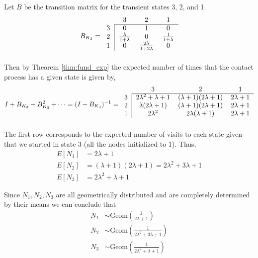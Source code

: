 
Let $B$ be the transition matrix for the transient states 3, 2, and 1.
$$
B_{K_3} = \begin{blockarray}{cccc}
    & 3 & 2 & 1\\
    \begin{block}{c|ccc}
    \cline{2-4}
        3 & 0 & 1 & 0\\
        2 & \frac{\lambda}{1 + \lambda} & 0 &
        \frac{1}{1 + \lambda}\\
        1 & 0 & \frac{2\lambda}{1 + 2 \lambda} & 0\\
    \end{block}
    \end{blockarray}
$$
Then by Theorem \ref{thm:fund_exp} the expected number of times that the contact process has a given state is given by,
$$
    I + B_{K_3} + B_{K_3}^2 + \cdots = (I - B_{K_3})^{-1} = \begin{blockarray}{cccc}
    & 3 & 2 & 1\\
    \begin{block}{c|ccc}
    \cline{2-4}
    3 & 2 \lambda^2 + \lambda + 1 & (\lambda + 1) (2 \lambda + 1) &  2 \lambda + 1\\
    2 & \lambda (2 \lambda + 1) & (\lambda + 1)(2 \lambda + 1) & 2 \lambda + 1\\
    1 & 2 \lambda^2 & 2 \lambda ( \lambda + 1) &  2\lambda + 1\\
    \end{block}
    \end{blockarray}
$$
The first row corresponds to the expected number of visits to each state given that we started in state 3 (all the nodes initialized to 1).
Thus,
\begin{align*}
    E[N_1] &= 2 \lambda + 1\\
    E[N_2] &= (\lambda + 1) (2 \lambda + 1) = 2\lambda^2 + 3 \lambda + 1\\
    E[N_3] &=  2 \lambda^2 + \lambda + 1
\end{align*}

Since $N_1, N_2, N_3$ are all geometrically distributed and are completely determined by their means we can conclude that
\begin{align*}
    N_1 &\sim  \text{Geom}\left(\frac{1}{2 \lambda + 1} \right)\\
    N_2 &\sim \text{Geom}\left(\frac{1}{2\lambda^2 + 3 \lambda + 1} \right)\\
    N_3 &\sim  \text{Geom}\left(\frac{1}{2 \lambda^2 + \lambda + 1}\right)
\end{align*}

